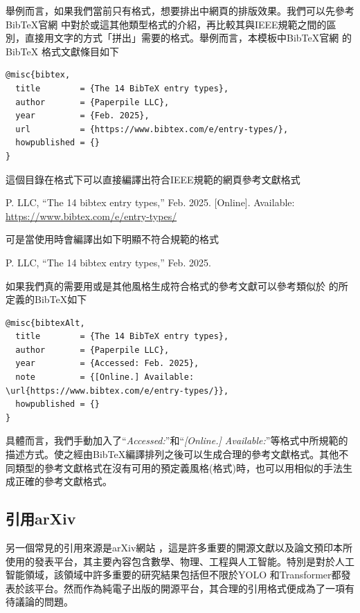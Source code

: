 \documentclass[12pt]{report}
\theoremstyle{plain}
\begin{document}
舉例而言，如果我們當前只有格式，想要排出中網頁的排版效果。我們可以先參考BibTeX官網 \cite{bibtex} 中對於或這其他類型格式的介紹，再比較其與IEEE規範\cite{ieeebib,ieeerefguide}之間的區別，直接用文字的方式「拼出」需要的格式。舉例而言，本模板中BibTeX官網 \cite{bibtex}的BibTeX 格式文獻條目如下
\begin{lstlisting}
@misc{bibtex,
  title        = {The 14 BibTeX entry types},
  author       = {Paperpile LLC},
  year         = {Feb. 2025},
  url          = {https://www.bibtex.com/e/entry-types/},
  howpublished = {}
}
\end{lstlisting}
這個目錄在格式下可以直接編譯出符合IEEE規範的網頁參考文獻格式
\begin{mdframed}
P. LLC, “The 14 bibtex entry types,” Feb. 2025. [Online]. Available: \url{https://www.bibtex.com/e/entry-types/}
\end{mdframed}
可是當使用時會編譯出如下明顯不符合規範的格式
\begin{mdframed}
P. LLC, “The 14 bibtex entry types,” Feb. 2025.
\end{mdframed}
如果我們真的需要用或是其他風格生成符合格式的參考文獻可以參考類似於 \cite{bibtexAlt} 的所定義的BibTeX如下
\begin{lstlisting}
@misc{bibtexAlt,
  title        = {The 14 BibTeX entry types},
  author       = {Paperpile LLC},
  year         = {Accessed: Feb. 2025},
  note         = {[Online.] Available: \url{https://www.bibtex.com/e/entry-types/}},
  howpublished = {}
}
\end{lstlisting}
具體而言，我們手動加入了``\textit{Accessed:}''和``\textit{[Online.] Available:}''等格式中所規範的描述方式。使之經由BibTeX編譯排列之後可以生成合理的參考文獻格式。其他不同類型的參考文獻格式在沒有可用的預定義風格(格式)時，也可以用相似的手法生成正確的參考文獻格式。

\subsection{引用arXiv}

另一個常見的引用來源是arXiv網站 \cite{arxiv}，這是許多重要的開源文獻以及論文預印本所使用的發表平台，其主要內容包含數學、物理、工程與人工智能。特別是對於人工智能領域，該領域中許多重要的研究結果包括但不限於YOLO \cite{redmon2016lookonceunifiedrealtime}和Transformer\cite{vaswani2023attentionneed}都發表於該平台。然而作為純電子出版的開源平台，其合理的引用格式便成為了一項有待議論的問題。
\end{document}
